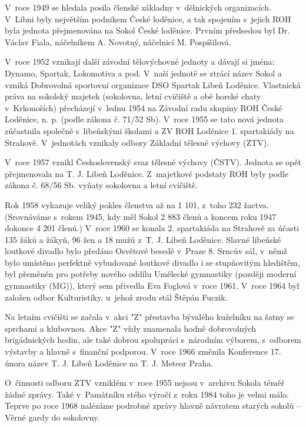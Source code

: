 \documentclass[a5paper, 11pt, twoside]{article}
\begin{document}
V~roce 1949 se hledala posila členské základny v~dělnických
organizacích. V~Libni byly největším podnikem České loděnice, a tak
spojením s~jejich ROH byla jednota přejmenována na Sokol České loděnice.
Prvním předsedou byl Dr. Václav Fiala, náčelníkem A. Novotný, náčelnicí
M. Pospíšilová.

V~roce 1952 vznikají další závodní tělovýchovné jednoty a dávají si
jména: Dynamo, Spartak, Lokomotiva a pod. V~naší jednotě se ztrácí název
Sokol a vzniká Dobrovolná sportovní organizace DSO Spartak Libeň
Loděnice. Vlastnická práva na sokolský majetek (sokolovna, letní
cvičiště a obě horské chaty v~Krkonoších) přecházejí v~lednu 1954 na
Závodní radu skupiny ROH České Loděnice, n. p. (podle zákona č. 71/52
Sb). V~roce 1955 se tato nová jednota zúčastnila společně s~libeňskými
školami a ZV ROH Loděnice 1. spartakiády na Strahově. V~jednotách
vznikaly odbory Základní tělesné výchovy (ZTV).

V~roce 1957 vznikl Československý svaz tělesné výchovy (ČSTV). Jednota
se opět přejmenovala na T. J. Libeň Loděnice. Z~majetkové podstaty ROH
byly podle zákona č. 68/56 Sb. vyňaty sokolovna a letní cvičiště.

Rok 1958 vykazuje veliký pokles členstva až na 1 101, z~toho 232 žactva.
(Srovnáváme s~rokem 1945, kdy měl Sokol 2 883 členů a koncem roku 1947
dokonce 4 201 členů.) V~roce 1960 se konala 2. spartakiáda na Strahově
za účasti 135 žáků a žákyň, 96 žen a 18 mužů z~T. J. Libeň Loděnice.
Slavné libeňské loutkové divadlo bylo předáno Osvětové besedě v~Praze 8.
Srncův sál, v~němž bylo umístěno perfektně vybudované loutkové divadlo i
se stupňovitým hledištěm, byl přeměněn pro potřeby nového oddílu
Umělecké gymnastiky (později moderní gymnastiky (MG)), který sem
přivedla Eva Foglová v~roce 1961. V~roce 1964 byl založen odbor
Kulturistiky, u~jehož zrodu stál Štěpán Fuczik.

Na letním cvičišti se začala v~akci "Z" přestavba bývalého kuželníku na
šatny se sprchami a klubovnou. Akce "Z" vždy znamenala hodně
dobrovolných brigádnických hodin, ale také dobrou spolupráci s~národním
výborem, s~odborem výstavby a hlavně s~finanční podporou. V~roce 1966
změnila Konference 17. února název T. J. Libeň Loděnice na T. J. Meteor
Praha.

O~činnosti odboru ZTV vzniklém v~roce 1955 nejsou v~archivu Sokola téměř
žádné zprávy. Také v~Památníku stého výročí z~roku 1984 toho je velmi
málo. Teprve po roce 1968 nalézáme podrobné zprávy hlavně návratem
starých sokolů -- Věrné gardy do sokolovny.
\end{document}
